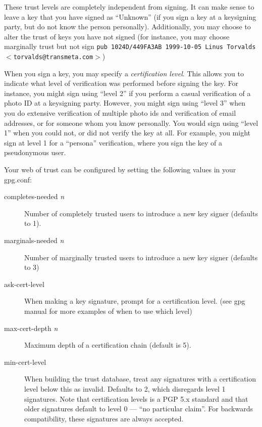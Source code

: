 \documentclass[letterpaper]{article}
\renewcommand{\_}[1]{\ifmmode_{_{#1}}\else\underline{\phantom{n}}$\,$#1\fi}
\begin{document}
These trust levels are completely independent from signing. It can make
sense to leave a key that you have signed as ``Unknown'' (if you sign a key
at a keysigning party, but do not know the person personally).
Additionally, you may choose to alter the trust of keys you have not signed
(for instance, you may choose marginally trust but not sign
\texttt{pub 1024D/449FA3AB 1999-10-05 Linus Torvalds $<$torvalds@transmeta.com$>$})


When you sign a key, you may specify a \textsl{certification level}. This
allows you to indicate what level of verification was performed before
signing the key. For instance, you might sign using ``level 2'' if you
perform a casual verification of a photo ID at a keysigning party. However,
you might sign using ``level 3'' when you do extensive verification of
multiple photo ids and verification of email addresses, or for someone whom
you know personally. You would sign using ``level 1'' when you could not,
or did not verify the key at all. For example, you might sign at level 1
for a ``persona'' verification, where you sign the key of a pseudonymous
user.

Your web of trust can be configured by setting the following values in your gpg.conf:

\begin{description}
\item[completes-needed \textsl{n}] Number of completely trusted users to introduce a
  new key signer (defaults to 1).

\item[marginals-needed \textsl{n}] Number of marginally trusted users to introduce a
  new key signer (defaults to 3)

\item[ask-cert-level] When making a key signature, prompt for a
  certification level. (see gpg manual for more examples of when to use
  which level)


\item[max-cert-depth \textsl{n}] Maximum depth of a certification chain (default is
  5).

\item[min-cert-level] When building the trust database, treat any
  signatures with a certification level below this as invalid. Defaults to
  2, which disregards level 1 signatures. Note that certification levels is
  a PGP 5.x standard and that older signatures default to level 0 --- ``no
  particular claim''. For backwards compatibility, these signatures are
  always accepted.
\end{description}
\end{document}
